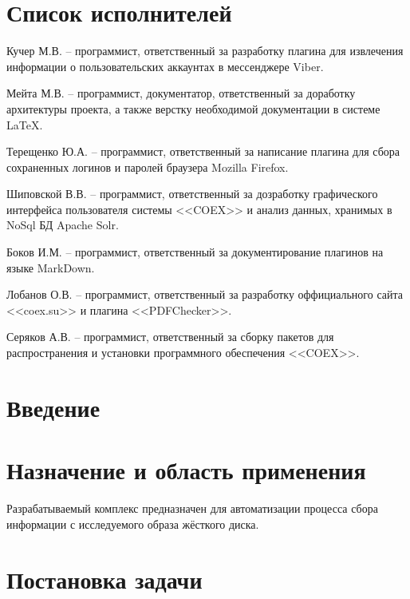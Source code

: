 


 
 
 
 \newpage
 \section*{Список исполнителей}
 
Кучер М.В. -- программист, ответственный за разработку плагина для извлечения информации о пользовательских аккаунтах в мессенджере Viber.

Мейта М.В. -- программист, документатор, ответственный за доработку архитектуры проекта, а также верстку необходимой документации в системе \LaTeX.

Терещенко Ю.А. -- программист, ответственный за написание плагина для сбора сохраненных логинов и паролей браузера Mozilla Firefox.

Шиповской В.В. -- программист, ответственный за дозработку графического интерфейса пользователя системы <<COEX>> и анализ данных, хранимых в NoSql БД Apache Solr.

Боков И.М. -- программист, ответственный за документирование плагинов на языке MarkDown.

Лобанов О.В. -- программист, ответственный за разработку оффициального сайта <<coex.su>> и плагина <<PDFChecker>>. 

Серяков А.В. -- программист, ответственный за сборку пакетов для распространения и установки программного обеспечения <<COEX>>.



 \newpage
 \tableofcontents

 \newpage
 \section*{Введение}
 

 \section{Назначение и область применения}
Разрабатываемый комплекс предназначен для автоматизации процесса сбора информации с исследуемого образа жёсткого диска.

\section{Постановка задачи}
\setcounter{figure}{0}


